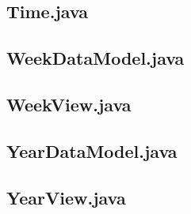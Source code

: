 \documentclass{article}
\begin{document}


\subsection{Time.java}



\subsection{WeekDataModel.java}



\subsection{WeekView.java}



\subsection{YearDataModel.java}



\subsection{YearView.java}


\end{document}
